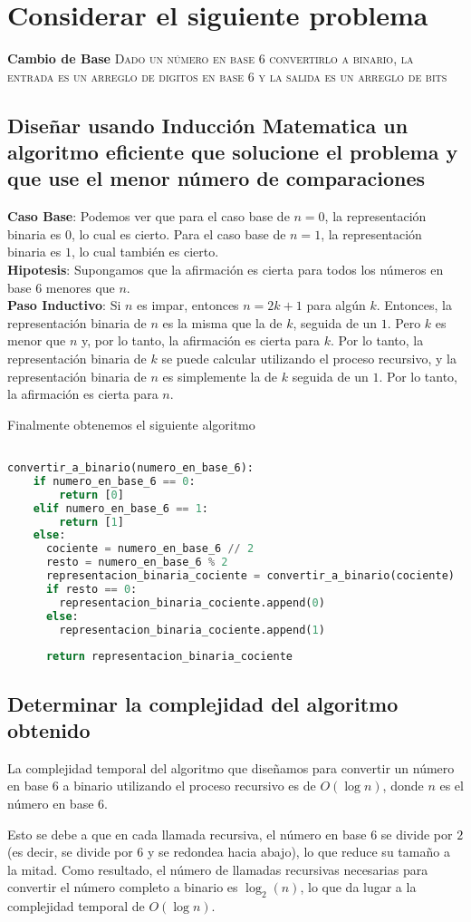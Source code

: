 \section{Considerar el siguiente problema}

\textbf{Cambio de Base}
\textsc{Dado un número en base $6$ convertirlo a binario, la entrada es un arreglo de digitos en base $6$ y la salida es un arreglo de bits}

\subsection{Diseñar usando Inducción Matematica un algoritmo eficiente que solucione el problema y que use el 
menor número de comparaciones}
\textbf{Caso Base}: Podemos ver que para el caso base de $n = 0$, la representación binaria es $0$, lo cual es cierto. 
Para el caso base de $n = 1$, la representación binaria es $1$, lo cual también es cierto.\\ 
\textbf{Hipotesis}: Supongamos que la afirmación es cierta para todos los números en base $6$ menores que $n$. \\
\textbf{Paso Inductivo}: Si $n$ es impar, entonces $n = 2k + 1$ para algún $k$. Entonces, la representación binaria de $n$
es la misma que la de $k$, seguida de un $1$. Pero $k$ es menor que $n$ y, por lo tanto, la afirmación es cierta para $k$. 
Por lo tanto, la representación binaria de $k$ se puede calcular utilizando el proceso recursivo, y la representación binaria de
$n$ es simplemente la de $k$ seguida de un $1$. Por lo tanto, la afirmación es cierta para $n$.


Finalmente obtenemos el siguiente algoritmo

\begin{lstlisting}[language=python]

convertir_a_binario(numero_en_base_6):
    if numero_en_base_6 == 0:
        return [0]
    elif numero_en_base_6 == 1:
        return [1]
    else:
      cociente = numero_en_base_6 // 2
      resto = numero_en_base_6 % 2
      representacion_binaria_cociente = convertir_a_binario(cociente)
      if resto == 0:
        representacion_binaria_cociente.append(0)
      else:
        representacion_binaria_cociente.append(1)
      
      return representacion_binaria_cociente
\end{lstlisting}

\subsection{Determinar la complejidad del algoritmo obtenido}

La complejidad temporal del algoritmo que diseñamos para convertir un número en base $6$ a binario utilizando el proceso recursivo es de $O(\log n)$, donde $n$ es el número en base $6$.

Esto se debe a que en cada llamada recursiva, el número en base $6$ se divide por $2$ (es decir, se divide por $6$ y se redondea hacia abajo), lo que reduce su tamaño a la mitad. Como resultado, el número de llamadas recursivas necesarias para convertir el número completo a binario es $\log_2(n)$, lo que da lugar a la complejidad temporal de $O(\log n)$.
